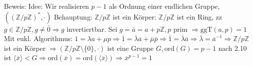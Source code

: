 \documentclass{article}
\newcommand{\Z}{\mathbb{Z}}
\newcommand{\ggT}{\text{ggT}}
\newcommand{\ord}{\text{ord}}
\begin{document}
Beweis:
Idee: Wir realisieren $p-1$ als Ordnung einer endlichen
Gruppe, $((\Z/p\Z)^*,\cdot)$ Behauptung: $\Z/p\Z$ ist
ein Körper: $\Z/p\Z$ ist ein Ring, zz $g\in\Z/p\Z,
g\neq\overline{0}\Rightarrow g$ invertiertbar.
Sei $g=\overline{a}=a+p\Z,p$ prim $\Rightarrow\ggT(a,p)=1$
Mit eukl. Algorithmus: $1=\lambda a+\mu p
\Rightarrow\overline{1}=\overline{\lambda}\overline{a}+
\overline{\mu}\overline{p}\Rightarrow\overline{1}=
\overline{\lambda}\overline{a}\Rightarrow\overline{\lambda}
=\overline{a}^{-1}\Rightarrow\Z/p\Z$ ist ein Körper
$\Rightarrow(\Z/p\Z\setminus\{0\},\cdot)$ ist eine Gruppe
$G,\ord(G)=p-1$ nach 2.10 ist $\langle\overline{x}\rangle<G
\Rightarrow\ord(\overline{x})=\ord(\langle\overline{x}
\rangle)\Rightarrow\overline{x}^{p-1}=1$
\end{document}

